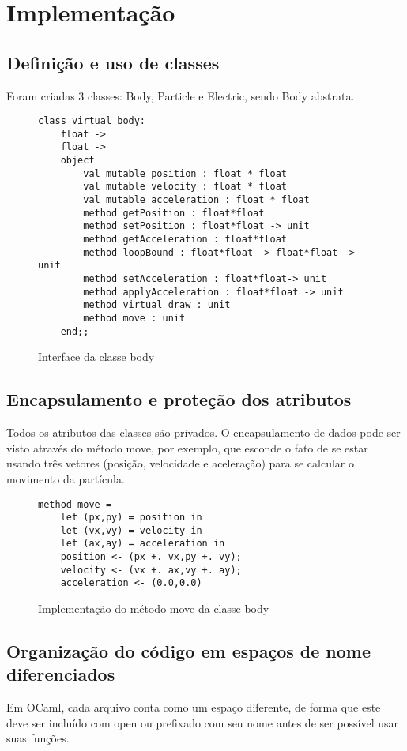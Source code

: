 \documentclass[a4paper,10pt]{article}
\begin{document}
\section{Implementação}

\subsection{Definição e uso de classes}
	Foram criadas 3 classes: Body, Particle e Electric, sendo Body abstrata.
	\begin{figure}[H]
	\centering	
\begin{lstlisting}
class virtual body:
	float ->
	float ->
	object
		val mutable position : float * float
		val mutable velocity : float * float
		val mutable acceleration : float * float
		method getPosition : float*float
		method setPosition : float*float -> unit
		method getAcceleration : float*float
		method loopBound : float*float -> float*float -> unit
		method setAcceleration : float*float-> unit
		method applyAcceleration : float*float -> unit
		method virtual draw : unit
		method move : unit
	end;;
	\end{lstlisting}
	\caption{Interface da classe body}
\end{figure}
	
\subsection{Encapsulamento e proteção dos atributos}
	Todos os atributos das classes são privados. O encapsulamento de dados pode ser visto através do método move, por exemplo, que esconde o fato de se estar usando três vetores (posição, velocidade e aceleração) para se calcular o movimento da partícula.
\begin{figure}[H]
	\centering	
	\begin{lstlisting}
method move =
	let (px,py) = position in
	let (vx,vy) = velocity in
	let (ax,ay) = acceleration in
	position <- (px +. vx,py +. vy);
	velocity <- (vx +. ax,vy +. ay);
	acceleration <- (0.0,0.0)
	\end{lstlisting}
	\caption{Implementação do método move da classe body}
\end{figure}
	
\subsection{Organização do código em espaços de nome diferenciados}
	Em OCaml, cada arquivo conta como um espaço diferente, de forma que este deve ser incluído com open ou prefixado com seu nome antes de ser possível usar suas funções.
	
\end{document}
